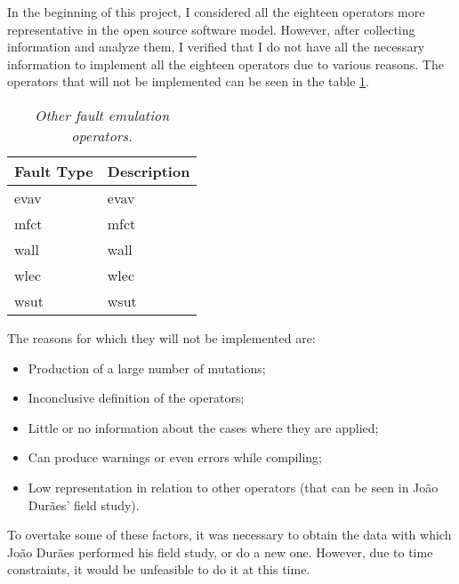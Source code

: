 In the beginning of this project, I considered all the eighteen operators more representative in the open source software model. However, after collecting information and analyze them, I verified that I do not have all the necessary information to implement all the eighteen operators due to various reasons.
The operators that will not be implemented can be seen in the table \ref{tab:otherfaultEmulationOperators}.

\begin{table}[!ht]
\begin{tabular}{|l|p{12cm}|}
\hline
\textbf{Fault Type}		& \multicolumn{1}{c|}{\textbf{Description}}		\\ \hline \hline
\acs{evav}        				& \Acl{evav}  									\\ \hline
\acs{mfct}        				& \Acl{mfct}  									\\ \hline
\acs{wall}       				& \Acl{wall} 									\\ \hline
\acs{wlec}       				& \Acl{wlec} 									\\ \hline
\acs{wsut}       				& \Acl{wsut} 									\\ \hline
\end{tabular}
\caption{\small \sl Other fault emulation operators.\label{tab:otherfaultEmulationOperators}}
\end{table}

The reasons for which they will not be implemented are:

\begin{itemize}
	\item Production of a large number of mutations;
	\item Inconclusive definition of the operators;
	\item Little or no information about the cases where they are applied;
	\item Can produce warnings or even errors while compiling;
	\item Low representation in relation to other operators (that can be seen in João Durães' field study).
\end{itemize}

To overtake some of these factors, it was necessary to obtain the data with which João Durães performed his field study, or do a new one. However, due to time constraints, it would be unfeasible to do it at this time.


